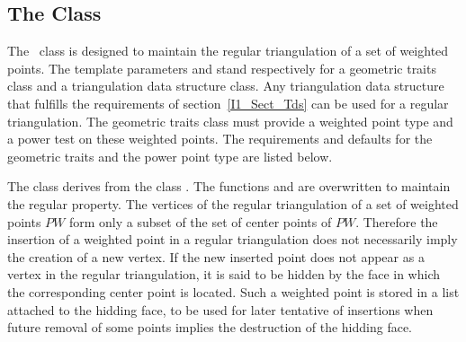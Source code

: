 \subsection{ The  Class \protect {}}
The \cgal\  class 
 is designed to maintain the
regular triangulation of a set of weighted points.
The template parameters   and  stand respectively
 for a geometric traits class and a triangulation data structure class.
Any triangulation data structure that fulfills the requirements of 
section~\ref{I1_Sect_Tds} can be used for a regular triangulation.
The geometric traits class must provide a weighted point type
and a power test on these weighted points. The requirements and defaults
for the geometric traits and the power point type are listed below.



The class 
derives from the class .
The
functions  and 
 are overwritten to maintain the regular
property.
The vertices of the regular triangulation
of a set of weighted points ${  PW}$ form only a subset
of the set of center points of ${   PW}$.
Therefore the  insertion of a weighted point  in a regular triangulation
does not necessarily imply the creation of a new vertex.
If the new inserted point does not appear as a vertex in the
regular triangulation, it is said to be hidden 
by the face in which the corresponding center point is located.
Such a weighted point is stored in a list attached to the hidding face,
to be used for later tentative of insertions when future removal
of some points implies the destruction of the hidding face.







